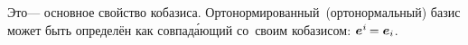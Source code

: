 \begin{otherlanguage}{russian}
\vspace{-0.1em}\noindent Это\:--- основное свойство кобазиса. Орто\-нормирован\-ный~(орто\-нормаль\-ный) базис может быть определён как совпад\'{а}ющий со~своим кобазисом: ${\bm{e}^{\hspace{0.05ex}i} \hspace{-0.2ex} = \bm{e}_{i}}$.


\begin{comment} %
\vspace{-0.5em}\[
\bm{a}_i \dotp \bm{a}^{\hspace{0.1ex}j} \hspace{-0.1ex} = \hspace{-0.2ex}
\scalebox{0.8}[0.8]{$\left[ \begin{array}{ccc}
\bm{a}_1 \hspace{-0.1ex} \dotp \bm{a}^{\hspace{-0.1ex}1} & \bm{a}_1 \hspace{-0.1ex} \dotp \bm{a}^2 & \bm{a}_1 \hspace{-0.1ex} \dotp \bm{a}^3 \\
\bm{a}_2 \hspace{-0.1ex} \dotp \bm{a}^{\hspace{-0.1ex}1} & \bm{a}_2 \hspace{-0.1ex} \dotp \bm{a}^2 & \bm{a}_2 \hspace{-0.1ex} \dotp \bm{a}^3 \\
\bm{a}_3 \hspace{-0.1ex} \dotp \bm{a}^{\hspace{-0.1ex}1} & \bm{a}_3 \hspace{-0.1ex} \dotp \bm{a}^2 & \bm{a}_3 \hspace{-0.1ex} \dotp \bm{a}^3
\end{array} \right]$} \!=\!
\scalebox{0.8}[0.8]{$\left[ \begin{array}{ccc}
1 & 0 & 0 \\
0 & 1 & 0 \\
0 & 0 & 1
\end{array} \right]$} \!=
\hspace{0.1ex} \delta_i^{\hspace{0.1ex}j}
\]
\end{comment} %


\end{otherlanguage}
